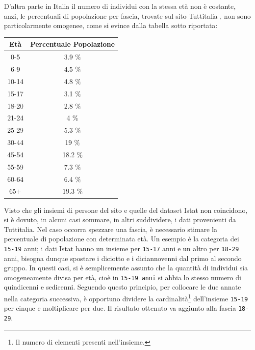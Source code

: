 \documentclass[a4paper,12pt]{report}
\newcommand{\columnstyle}[1]{\texttt{#1}}
\begin{document}
D'altra parte in Italia il numero di individui con 
la stessa età non è costante, anzi, le percentuali di popolazione per fascia, 
trovate sul sito Tuttitalia \cite{TUTTITALIA:1}, non sono particolarmente omogenee, 
come si evince dalla tabella sotto riportata: 

\begin{center}
    \def\arraystretch{1.5}%
    \begin{tabular}{ |c|c| } 
    \hline
    Età & Percentuale Popolazione \\ 
    \hline
    \rowcolor{TableGray}
    0-5     & 3.9 \% \\ 
    6-9     & 4.5 \% \\
    \rowcolor{TableGray}
    10-14   & 4.8 \% \\
    15-17   & 3.1 \% \\
    \rowcolor{TableGray}
    18-20   & 2.8 \% \\ 
    21-24   & 4   \% \\
    \rowcolor{TableGray}
    25-29   & 5.3 \% \\
    30-44   & 19  \% \\
    \rowcolor{TableGray}
    45-54   & 18.2 \% \\ 
    55-59   & 7.3 \% \\
    \rowcolor{TableGray}
    60-64   & 6.4 \% \\
    65$+$   & 19.3 \% \\
    \hline
    \end{tabular}
\end{center}

Visto che gli insiemi di persone del sito e quelle del dataset Istat non coincidono, 
si è dovuto, in alcuni casi sommare, in altri suddividere, 
i dati provenienti da Tuttitalia. 
Nel caso occorra spezzare una fascia, è necessario stimare la percentuale 
di popolazione con determinata età. 
Un esempio è la categoria dei \columnstyle{15-19} anni; 
i dati Istat hanno un insieme per \columnstyle{15-17} anni e un altro per 
\columnstyle{18-29} anni, 
bisogna dunque spostare i diciotto e i diciannovenni dal primo al 
secondo gruppo. 
In questi casi, si è semplicemente assunto che la quantità di individui sia omogeneamente 
divisa per età, cioè in \columnstyle{15-19 anni} si abbia lo stesso numero di 
quindicenni e sedicenni. 
Seguendo questo principio, per collocare le due annate nella categoria successiva, 
è opportuno dividere la cardinalità\footnote{Il numero di elementi presenti nell'insieme.} 
dell'insieme \columnstyle{15-19} per cinque e moltiplicare per due. 
Il risultato ottenuto va aggiunto alla fascia \columnstyle{18-29}. 
\end{document}
